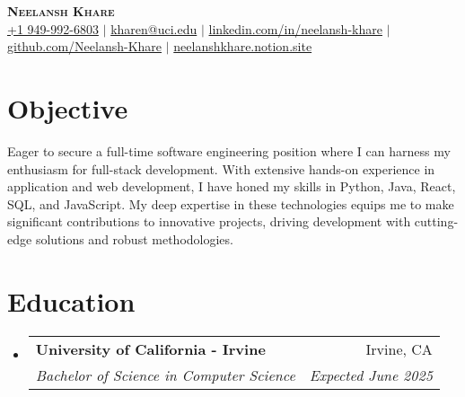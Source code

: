 \documentclass[letterpaper,11pt]{article}
\makeatletter
\newcommand{\resumeSubheading}[4]{
  \vspace{-2pt}\item
    \begin{tabular*}{0.97\textwidth}[t]{l@{\extracolsep{\fill}}r}
      \textbf{#1} & #2 \\
      \textit{\small#3} & \textit{\small #4} \\
    \end{tabular*}\vspace{-7pt}
}
\newcommand{\resumeSubHeadingListStart}{\begin{itemize}[leftmargin=0.15in, label={}]}
\newcommand{\resumeSubHeadingListEnd}{\end{itemize}}
\makeatother
\begin{document}
\begin{center}  
    \textbf{\Huge \scshape Neelansh Khare} \\ \vspace{1pt}
    \color{blue}
    \small \href{tel:19499926803}{{+1 949-992-6803}} $|$ \href{mailto:kharen@uci.edu}{{kharen@uci.edu}} $|$ 
    \href{https://linkedin.com/in/neelansh-khare}{{linkedin.com/in/neelansh-khare}} $|$
    \href{https://github.com/Neelansh-Khare}{{github.com/Neelansh-Khare}} $|$
    \href{http://neelanshkhare.notion.site}{{neelanshkhare.notion.site}} 
\end{center}

\section{Objective}
\begin{itemize}[leftmargin=0.15in, label={}]
  \small{\item{
   \textbf{}{Eager to secure a full-time software engineering position where I can harness my enthusiasm for full-stack development. With extensive hands-on experience in application and web development, I have honed my skills in Python, Java, React, SQL, and JavaScript. My deep expertise in these technologies equips me to make significant contributions to innovative projects, driving development with cutting-edge solutions and robust methodologies.} \\
  }}
  \end{itemize}


\section{Education}
  \resumeSubHeadingListStart
    \resumeSubheading
      {University of California - Irvine}{Irvine, CA}
      {Bachelor of Science in Computer Science}{Expected June 2025}
  \resumeSubHeadingListEnd
  
\end{document}
